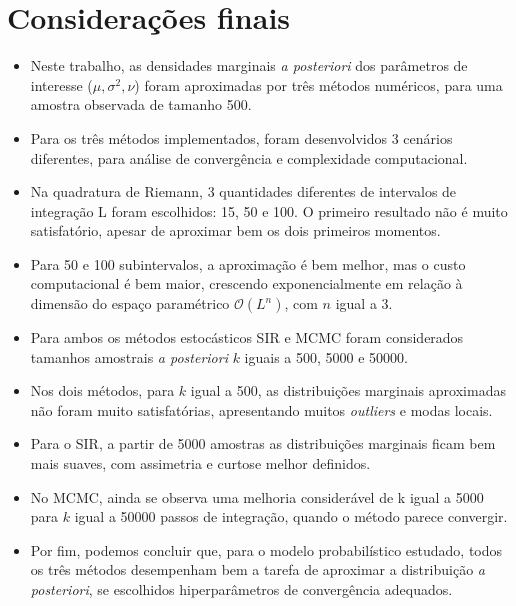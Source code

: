 \documentclass[9pt]{beamer}
\begin{document}
\section{Considerações finais}
\begin{frame}
\begin{itemize}
\justifying	
\item Neste trabalho, as densidades marginais \textit{a posteriori} dos parâmetros de interesse ($\mu, \sigma^2, \nu$) foram aproximadas por três métodos numéricos, para uma amostra observada de tamanho 500.
\item Para os três métodos implementados, foram desenvolvidos 3 cenários diferentes, para análise de convergência e complexidade computacional.
\item Na quadratura de Riemann, 3 quantidades diferentes de intervalos de integração L foram escolhidos: 15, 50 e 100. O primeiro resultado não é muito satisfatório, apesar de aproximar bem os dois primeiros momentos.	
\item Para 50 e 100 subintervalos, a aproximação é bem melhor, mas o custo computacional é bem maior, crescendo exponencialmente em relação à dimensão do espaço paramétrico $\mathcal{O}(L^n)$, com $n$ igual a 3.
\end{itemize}	
\end{frame}
\begin{frame}
\begin{itemize}
	\justifying	
	\item Para ambos os métodos estocásticos SIR e MCMC foram considerados tamanhos amostrais \textit{a posteriori} $k$ iguais a 500, 5000 e 50000.
	
	\item Nos dois métodos, para $k$ igual a 500, as distribuições marginais aproximadas não foram muito satisfatórias, apresentando muitos \textit{outliers} e modas locais.
	
	\item Para o SIR, a partir de 5000 amostras as distribuições marginais ficam bem mais suaves, com assimetria e curtose melhor definidos.
	
	\item No MCMC, ainda se observa uma melhoria considerável de k
	igual a 5000 para $k$ igual a 50000 passos de integração, quando o método parece convergir.
	
	\item Por fim, podemos concluir que, para o modelo probabilístico estudado, todos os três métodos desempenham bem a tarefa de aproximar a distribuição \textit{a posteriori}, se escolhidos hiperparâmetros de convergência adequados.
\end{itemize}	
\end{frame}
\end{document}
